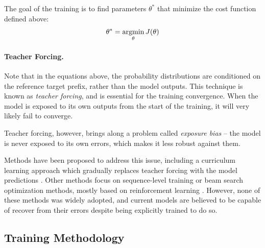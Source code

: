 The goal of the training is to find parameters $\theta^*$ that minimize the
cost function defined above:
\begin{equation}
  \theta^* = \operatorname*{argmin}_{\theta}J(\theta)
\end{equation}


\paragraph{Teacher Forcing.}
Note that in the equations above, the probability distributions are conditioned
on the reference target prefix, rather than the model outputs. This technique
is known as \emph{teacher forcing}, and is essential for the training
convergence. When the model is exposed to its own outputs from the start of the
training, it will very likely fail to converge.

Teacher forcing, however, brings along a problem called \emph{exposure bias} --
the model is never exposed to its own errors, which makes it less robust
against them.

Methods have been proposed to address this issue, including a curriculum
learning approach which gradually replaces teacher forcing with the model
predictions \citep{bengio2015scheduled}. Other methods focus on sequence-level
training or beam search optimization methods, mostly based on reinforcement
learning \citep{williams1992simple, wiseman-rush-2016-sequence,
  ranzato2016sequence}. However, none of these methods was widely adopted, and
current models are believed to be capable of recover from their errors despite
being explicitly trained to do so.


\subsection{Training Methodology}
\label{sec:training:methodology}

